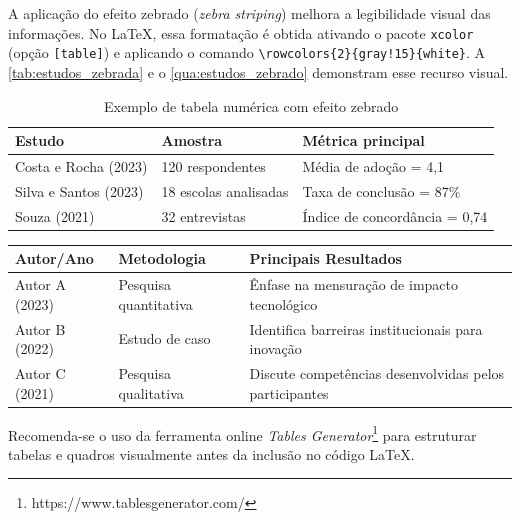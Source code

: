 \documentclass[
    12pt,        %
    openany,     %
    oneside,     %
    a4paper,     %
    english,     %
    brazil,      %
    article      %
]{abntex2}
\begin{document}
A aplicação do efeito zebrado (\textit{zebra striping}) melhora a legibilidade visual das informações. No LaTeX, essa formatação é obtida ativando o pacote \texttt{xcolor} (opção \texttt{[table]}) e aplicando o comando \verb|\rowcolors{2}{gray!15}{white}|. A \autoref{tab:estudos_zebrada} e o \autoref{qua:estudos_zebrado} demonstram esse recurso visual.

\begin{table}[htbp]
    \centering
    \caption{Exemplo de tabela numérica com efeito zebrado}
    \label{tab:estudos_zebrada}
    \begin{tabularx}{0.8\textwidth}{p{4cm}XX}
        \toprule
        \textbf{Estudo} & \textbf{Amostra} & \textbf{Métrica principal} \\
        \midrule
        Costa e Rocha (2023) & 120 respondentes & Média de adoção = 4,1 \\
        Silva e Santos (2023) & 18 escolas analisadas & Taxa de conclusão = 87\% \\
        Souza (2021) & 32 entrevistas & Índice de concordância = 0,74 \\
        \bottomrule
    \end{tabularx}
\end{table}

\begin{quadro}[htbp]
    \centering
    \caption{Exemplo de quadro qualitativo com efeito zebrado}
    \label{qua:estudos_zebrado}
    \begin{tabularx}{\textwidth}{|p{3cm}|p{4cm}|X|}
        \hline
        \textbf{Autor/Ano} & \textbf{Metodologia} & \textbf{Principais Resultados} \\
        \hline
        Autor A (2023) & Pesquisa quantitativa & Ênfase na mensuração de impacto tecnológico \\ \hline
        Autor B (2022) & Estudo de caso & Identifica barreiras institucionais para inovação \\ \hline
        Autor C (2021) & Pesquisa qualitativa & Discute competências desenvolvidas pelos participantes \\ \hline
    \end{tabularx}
\end{quadro}

Recomenda-se o uso da ferramenta online \textit{Tables Generator}\footnote{https://www.tablesgenerator.com/} para estruturar tabelas e quadros visualmente antes da inclusão no código LaTeX.
\end{document}
